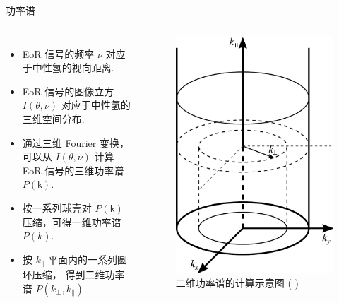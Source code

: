 \documentclass{beamer}
\newcommand{\B}[1]{\bm{\mathsf{#1}}}  %
\newcommand{\citeay}[1]{\citeauthor{#1} \citeyear{#1} \parencite{#1}}
\begin{document}
\begin{frame}{功率谱}
  \begin{columns}
    \begin{itemize}
      \item EoR 信号的频率 $\nu$ 对应于中性氢的视向距离.
      \item EoR 信号的\alert{图像立方} $I(\B{\theta}, \nu)$
        对应于中性氢的三维空间分布.
      \item 通过三维 Fourier 变换，可以从 $I(\B{\theta}, \nu)$
        计算 EoR 信号的\alert{三维功率谱} $P(\B{k})$.
      \item 按一系列球壳对 $P(\B{k})$ 压缩，可得\alert{一维功率谱} $P(k)$.
      \item 按 $k_{\parallel}$ 平面内的一系列圆环压缩，
        得到\alert{二维功率谱} $P(k_{\perp}, k_{\parallel})$.
    \end{itemize}

    \begin{figure}
      \centering
      \includegraphics[width=\columnwidth]{ps2d-annuli-diagram}
      \caption{二维功率谱的计算示意图 (\citeay{thyagarajan2013})}
    \end{figure}
  \end{columns}
\end{frame}
\end{document}
